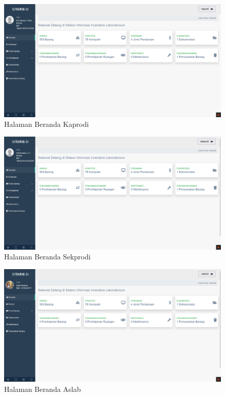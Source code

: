 \begin{enumerate}
        \begin{figure}
          \centering
          \includegraphics[width=0.82\linewidth]{konten//gambar/kaprodi.png}
          \caption{Halaman Beranda Kaprodi}
          \label{fig:enter-label}
        \end{figure}

        \begin{figure}
          \centering
          \includegraphics[width=0.82\linewidth]{konten//gambar/sekprodi.png}
          \caption{Halaman Beranda Sekprodi}
          \label{fig:enter-label}
        \end{figure}

        \begin{figure}
          \centering
          \includegraphics[width=0.82\linewidth]{konten//gambar/aslab.png}
          \caption{Halaman Beranda Aslab}
          \label{fig:enter-label}
        \end{figure}


\end{enumerate}
